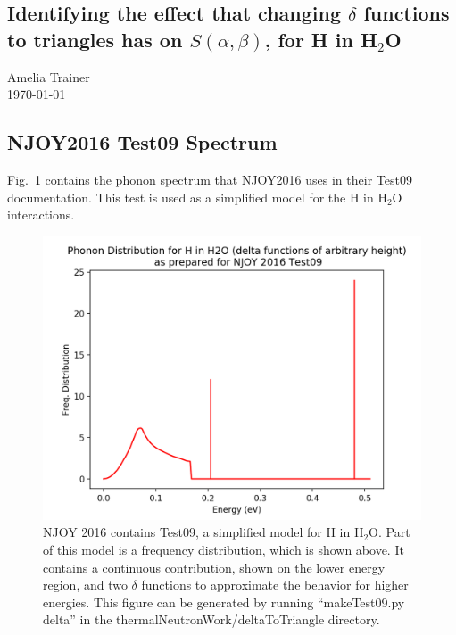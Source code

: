 \documentclass[10pt]{article}
\renewcommand{\title}[1]{\textbf{#1}\\}
\renewcommand{\line}{\begin{tabularx}{\textwidth}{X>{\raggedleft}X}\hline\\\end{tabularx}\\[-0.5cm]}
\newcommand{\leftright}[2]{\begin{tabularx}{\textwidth}{X>{\raggedleft}X}#1%
\end{tabularx}\\[-0.5cm]}
\begin{document}

\begin{center}\section*{Identifying the effect that changing $\delta$ functions to triangles has on $S(\alpha,\beta)$, for H in H$_2$O}

  Amelia Trainer \\
  \today
\end{center}

\subsection*{NJOY2016 Test09 Spectrum}

  Fig.~\ref{fig:waterPhonon} contains the phonon spectrum that NJOY2016 uses in their Test09 documentation. This test is used as a simplified model for the H in H$_2$O interactions. 
            \begin{figure}[H]
              \begin{center}
              \includegraphics[scale=0.5]{waterPhononDist}
                \caption{NJOY 2016 contains Test09, a simplified model for H in H$_2$O. Part of this model is a frequency distribution, which is shown above. It contains a continuous contribution, shown on the lower energy region, and two $\delta$ functions to approximate the behavior for higher energies. This figure can be generated by running ``makeTest09.py delta'' in the thermalNeutronWork/deltaToTriangle directory.}
              \label{fig:waterPhonon}
              \end{center}
            \end{figure}
\end{document}
